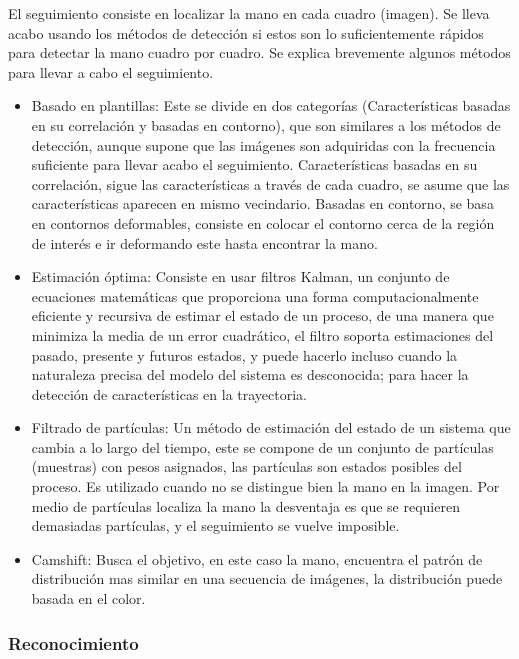El seguimiento consiste en localizar la mano en cada cuadro (imagen). Se lleva acabo usando los métodos de detección si estos son lo suficientemente rápidos para detectar la mano cuadro por cuadro. Se explica brevemente algunos  métodos para llevar a cabo el seguimiento. 
\begin{itemize}
	\item Basado en plantillas: Este se divide en dos categorías (Características basadas en su correlación y basadas en contorno), que son similares a los métodos de detección, aunque supone que las imágenes son adquiridas con la frecuencia suficiente para llevar acabo el seguimiento. Características basadas en su correlación, sigue las características a través de cada cuadro, se asume que las características aparecen en mismo vecindario. Basadas en contorno, se basa en contornos deformables, consiste en colocar el contorno cerca de la región de interés e ir deformando este hasta encontrar la mano. 
	\item Estimación óptima: Consiste en usar filtros Kalman, un conjunto de ecuaciones matemáticas que proporciona una forma  computacionalmente eficiente y recursiva de estimar el estado de un proceso, de una manera que minimiza la media de un error cuadrático, el filtro soporta estimaciones del pasado, presente y futuros estados, y puede hacerlo incluso cuando la naturaleza precisa del modelo del sistema es desconocida;  para hacer la detección de características en la trayectoria. 
	\item Filtrado de partículas: Un método de estimación del estado de un sistema que cambia a lo largo del tiempo, este se compone de un conjunto de partículas (muestras) con pesos asignados, las partículas son estados posibles del proceso. Es utilizado cuando no se distingue bien la mano en la imagen. Por medio de partículas localiza la mano la desventaja es que se requieren demasiadas partículas, y el seguimiento se vuelve imposible. 
	\item Camshift: Busca el objetivo, en este caso la mano, encuentra el patrón de distribución mas similar en una secuencia de imágenes, la distribución puede basada en el color. 
\end{itemize}

\subsubsection{Reconocimiento}\label{sssec:EtapaReconocimiento}

